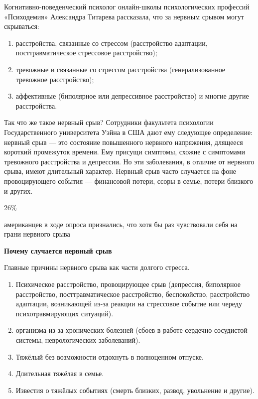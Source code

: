 Когнитивно-поведенческий психолог онлайн-школы психологических профессий «Психодемия» Александра Титарева рассказала, что за нервным срывом могут скрываться:
\begin{enumerate}
    \item расстройства, связанные со стрессом (расстройство адаптации, посттравматическое стрессовое расстройство);
    \item тревожные и связанные со стрессом расстройства (генерализованное тревожное расстройство);
    \item аффективные (биполярное или депрессивное расстройство) и многие другие расстройства.
\end{enumerate}

Так что же такое нервный срыв? Сотрудники факультета психологии Государственного университета Уэйна в США дают ему следующее определение: нервный срыв  ---  это состояние повышенного нервного напряжения, длящееся короткий промежуток времени. Ему присущи симптомы, схожие с симптомами тревожного расстройства и депрессии. Но эти заболевания, в отличие от нервного срыва, имеют длительный характер. Нервный срыв часто случается на фоне провоцирующего события  ---  финансовой потери, ссоры в семье, потери близкого и других.

\begin{framed}
    \begin{center}
        {
            \Huge
            26\%
        }

        {
            \Large
            американцев в ходе опроса признались, что хотя бы раз чувствовали себя на грани нервного срыва
        }
    \end{center}
\end{framed}


\newpage
\textbf{Почему случается нервный срыв}

Главные причины нервного срыва как части долгого стресса.
\begin{enumerate}
    \item Психическое расстройство, провоцирующее срыв (депрессия, биполярное расстройство, посттравматическое расстройство, беспокойство, расстройство адаптации, возникающей из-за реакции на стрессовое событие или череду психотравмирующих ситуаций).
    \item {} организма из-за хронических болезней (сбоев в работе сердечно-сосудистой системы, неврологических заболеваний).
    \item Тяжёлый  без возможности отдохнуть в полноценном отпуске.
    \item Длительная тяжёлая  в семье.
    \item Известия о тяжёлых событиях (смерть близких, развод, увольнение и другие).
\end{enumerate}


